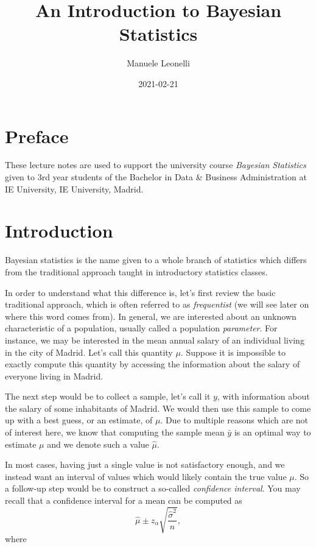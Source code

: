 \documentclass[
]{book}
\title{An Introduction to Bayesian Statistics}
\author{Manuele Leonelli}
\date{2021-02-21}
\begin{document}
\maketitle

{
\setcounter{tocdepth}{1}
\tableofcontents
}
\hypertarget{preface}{%
\chapter*{Preface}\label{preface}}

These lecture notes are used to support the university course \emph{Bayesian Statistics} given to 3rd year students of the Bachelor in Data \& Business Administration at IE University, IE University, Madrid.

\hypertarget{intro}{%
\chapter{Introduction}\label{intro}}

Bayesian statistics is the name given to a whole branch of statistics which differs from the traditional approach taught in introductory statistics classes.

In order to understand what this difference is, let's first review the basic traditional approach, which is often referred to as \emph{frequentist} (we will see later on where this word comes from). In general, we are interested about an unknown characteristic of a population, usually called a population \emph{parameter}. For instance, we may be interested in the mean annual salary of an individual living in the city of Madrid. Let's call this quantity \(\mu\). Suppose it is impossible to exactly compute this quantity by accessing the information about the salary of everyone living in Madrid.

The next step would be to collect a sample, let's call it \(y\), with information about the salary of some inhabitants of Madrid. We would then use this sample to come up with a best guess, or an estimate, of \(\mu\). Due to multiple reasons which are not of interest here, we know that computing the sample mean \(\bar{y}\) is an optimal way to estimate \(\mu\) and we denote such a value \(\hat{\mu}\).

In most cases, having just a single value is not satisfactory enough, and we instead want an interval of values which would likely contain the true value \(\mu\). So a follow-up step would be to construct a so-called \emph{confidence interval}. You may recall that a confidence interval for a mean can be computed as
\[
\hat{\mu}\pm z_{\alpha}\sqrt{\frac{\hat{\sigma}^2}{n}},
\]
where
\end{document}
